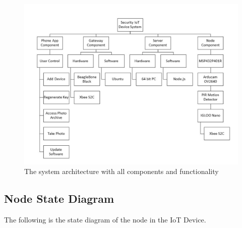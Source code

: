\documentclass[11pt]{article}
\begin{document}
\begin{figure}[!ht]
\centering
\includegraphics[scale = 0.55]{system2.png}
\caption{The system architecture with all components and functionality}
\end{figure}
\FloatBarrier

\subsection{Node State Diagram}

The following is the state diagram of the node in the IoT Device. 
\end{document}
